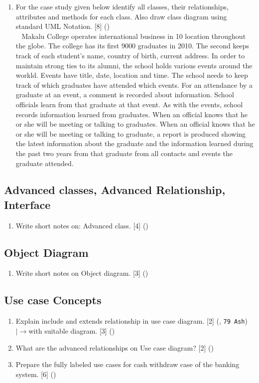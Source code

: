 \documentclass[12pt]{article}
\newcommand{\lb}{\\$\left|\rightarrow\right.$}
\newcommand{\enter}{\\\textcolor{white}{1}}
\begin{document}
\begin{enumerate}
      \item For the case study given below identify all classes, their relationships, attributes and methods for each class. Also draw class diagram using standard UML Notation. \hfill [8] () \enter
        Makalu College operates international business in 10 location throughout the globe. The college has its first 9000 graduates in 2010. The second keeps track of each student's name, country of birth, current address. In order to maintain strong ties to its alumni, the school holds various events around the workld. Events have title, date, location and time. The school needs to keep track of which graduates have attended which events. For an attendance by a graduate at an event, a comment is recorded about information. School officials learn from that graduate at that event. As with the events, school records information learned from graduates. When an official knows that he or she will be meeting or talking to graduates. When an official knows that he or she will be meeting or talking to graduate, a report is produced showing the latest information about the graduate and the information learned during the past two years from that graduate from all contacts and events the graduate attended.
    \end{enumerate}

  \subsection{Advanced classes, Advanced Relationship, Interface}
    \begin{enumerate}
      \item Write short notes on: Advanced class. \hfill [4] ()
    \end{enumerate}

  \subsection{Object Diagram}
    \begin{enumerate}
      \item Write short notes on Object diagram. \hfill [3] ()
    \end{enumerate}

  \subsection{Use case Concepts}
    \begin{enumerate}
      \item Explain include and extends relationship in use case diagram. \hfill [2] (, \texttt{79 Ash})
        \lb with suitable diagram. \hfill [3] ()

      \item What are the advanced relationships on Use case diagram? \hfill [2] ()

      \item Prepare the fully labeled use cases for cash withdraw case of the banking system. \hfill [6] ()
    \end{enumerate}
\end{document}
